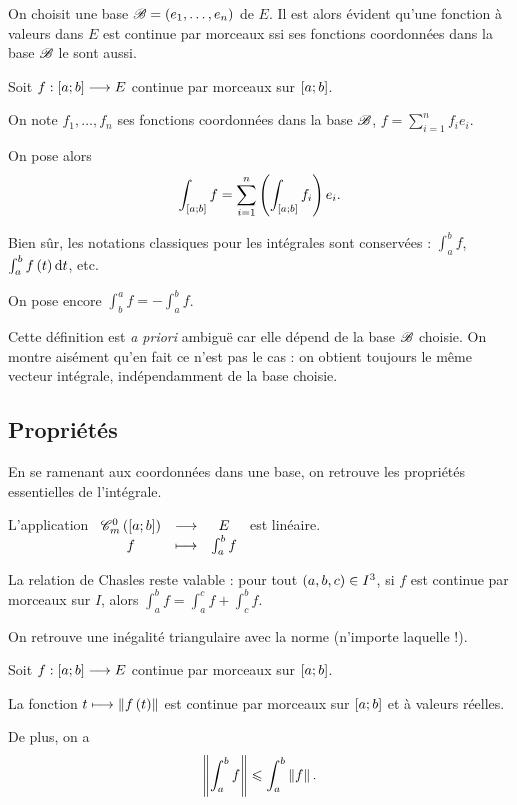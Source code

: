 On choisit une base \(\mathscr{B}=\left(e_1,\dots,e_n\right)\) de \(E\). Il est alors évident qu'une fonction à valeurs dans \(E\) est continue par morceaux ssi ses fonctions coordonnées dans la base \(\mathscr{B}\) le sont aussi.

\begin{defi}
Soit \(f:\left[a;b\right]\longrightarrow E\) continue par morceaux sur \(\left[a;b\right]\).

On note \(f_1,\dots,f_n\) ses fonctions coordonnées dans la base \(\mathscr{B}\), \ie \(f=\sum_{i=1}^nf_ie_i\).

On pose alors \[\int_{\left[a;b\right]}f=\sum_{i=1}^n\left(\int_{\left[a;b\right]}f_i\right)e_i.\]
\end{defi}

Bien sûr, les notations classiques pour les intégrales sont conservées : \(\int_a^bf\), \(\int_a^bf\paren{t}\odif{t}\), etc.

On pose encore \(\int_b^af=-\int_a^bf\).

Cette définition est \textit{a priori} ambiguë car elle dépend de la base \(\mathscr{B}\) choisie. On montre aisément qu'en fait ce n'est pas le cas : on obtient toujours le même vecteur intégrale, indépendamment de la base choisie.

\subsection{Propriétés}

En se ramenant aux coordonnées dans une base, on retrouve les propriétés essentielles de l'intégrale.

\begin{prop}
L'application \(\begin{array}[t]{ccc}\mathscr{C}^{0}_m\left(\left[a;b\right]\right) & \longrightarrow & E \\ f & \longmapsto & \int_a^bf\end{array}\) est linéaire.
\end{prop}

\begin{prop}
La relation de Chasles reste valable : pour tout \(\left(a,b,c\right)\in I^3\), si \(f\) est continue par morceaux sur \(I\), alors \(\int_a^bf=\int_a^cf+\int_c^bf\).
\end{prop}

On retrouve une inégalité triangulaire avec la norme (n'importe laquelle !).

\begin{prop}
Soit \(f:\left[a;b\right]\longrightarrow E\) continue par morceaux sur \(\left[a;b\right]\).

La fonction \(t\mapsto\norme{f\paren{t}}\) est continue par morceaux sur \(\left[a;b\right]\) et à valeurs réelles.

De plus, on a \[\norme{\int_a^bf}\leq\int_a^b\norme{f}.\]
\end{prop}

